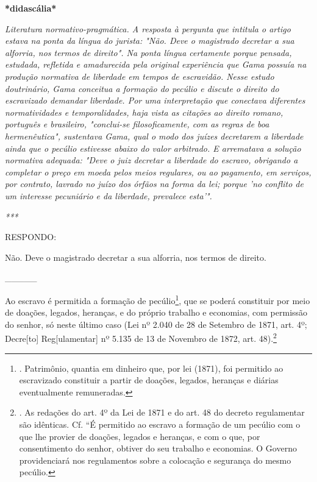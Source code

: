 \textbf{*didascália*}

\emph{Literatura normativo-pragmática. A resposta à pergunta que
intitula o artigo estava na ponta da língua do jurista: "Não. Deve o
magistrado decretar a sua alforria, nos termos de direito". Na ponta
língua certamente porque pensada, estudada, refletida e amadurecida pela
original experiência que Gama possuía na produção normativa de liberdade
em tempos de escravidão. Nesse estudo doutrinário, Gama conceitua a
formação do pecúlio e discute o direito do escravizado demandar
liberdade. Por uma interpretação que conectava diferentes normatividades
e temporalidades, haja vista as citações ao direito romano, português e
brasileiro, "conclui-se filosoficamente, com as regras de boa
hermenêutica", sustentava Gama, qual o modo dos juízes decretarem a
liberdade ainda que o pecúlio estivesse abaixo do valor arbitrado. E
arrematava a solução normativa adequada: "Deve o juiz decretar a
liberdade do escravo, obrigando a completar o preço em moeda pelos meios
regulares, ou ao pagamento, em serviços, por contrato, lavrado no juízo
dos órfãos na forma da lei; porque 'no conflito de um interesse
pecuniário e da liberdade, prevalece esta'". }

\emph{***}

RESPONDO:

Não. Deve o magistrado decretar a sua alforria, nos termos de direito.

\_\_\_\_\_

Ao escravo é permitida a formação de pecúlio\footnote{. Patrimônio,
  quantia em dinheiro que, por lei (1871), foi permitido ao escravizado
  constituir a partir de doações, legados, heranças e diárias
  eventualmente remuneradas.}, que se poderá constituir por meio de
doações, legados, heranças, e do próprio trabalho e economias, com
permissão do senhor, só neste último caso (Lei nº 2.040 de 28 de
Setembro de 1871, art. 4º; Decre{[}to{]} Reg{[}ulamentar{]} nº 5.135 de
13 de Novembro de 1872, art. 48).\footnote{. As redações do art. 4º da
  Lei de 1871 e do art. 48 do decreto regulamentar são idênticas. Cf.
  ``É permitido ao escravo a formação de um pecúlio com o que lhe
  provier de doações, legados e heranças, e com o que, por consentimento
  do senhor, obtiver do seu trabalho e economias. O Governo
  providenciará nos regulamentos sobre a colocação e segurança do mesmo
  pecúlio.}

